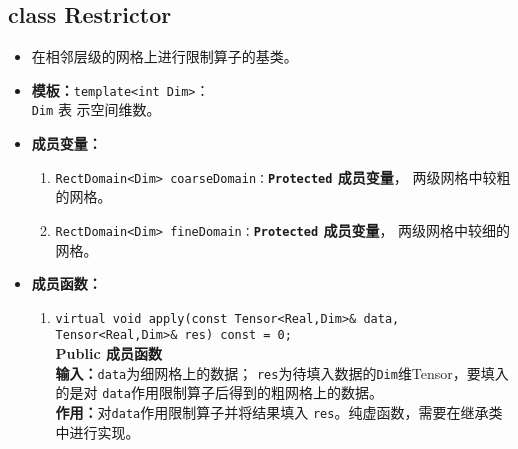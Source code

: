 \documentclass[a4paper,twoside]{ctexart}
\begin{document}
\subsection*{class Restrictor}
\begin{itemize}
    \item 在相邻层级的网格上进行限制算子的基类。
    \item \textbf{模板：}\texttt{template<int Dim>}：\\\texttt{Dim} 表
      示空间维数。
       \item \textbf{成员变量：}
        \begin{enumerate}[(1)]
            \item \texttt{RectDomain<Dim>
                coarseDomain：}\textbf{\texttt{Protected}  成员变量}，
              两级网格中较粗的网格。
              \item \texttt{RectDomain<Dim>
                fineDomain：}\textbf{\texttt{Protected}  成员变量}，
              两级网格中较细的网格。
        \end{enumerate}
    \item \textbf{成员函数：}
            \begin{enumerate}[(1)]
                \item \texttt{virtual void apply(const Tensor<Real,Dim>\& data,
                    Tensor<Real,Dim>\& res) const = 0;}\\
                  \textbf{Public 成员函数}\\
                \textbf{输入：}\texttt{data}为细网格上的数据；
                \texttt{res}为待填入数据的\texttt{Dim}维Tensor，要填入的是对
                \texttt{data}作用限制算子后得到的粗网格上的数据。\\
                \textbf{作用：}对\texttt{data}作用限制算子并将结果填入
                \texttt{res}。纯虚函数，需要在继承类中进行实现。
            \end{enumerate}
          \end{itemize}
\end{document}
